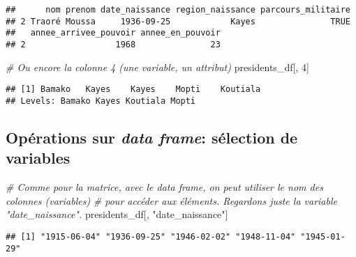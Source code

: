 \documentclass[]{book}
\newenvironment{Shaded}{\begin{snugshade}}{\end{snugshade}}
\newcommand{\DecValTok}[1]{\textcolor[rgb]{0.00,0.00,0.81}{#1}}
\newcommand{\StringTok}[1]{\textcolor[rgb]{0.31,0.60,0.02}{#1}}
\newcommand{\CommentTok}[1]{\textcolor[rgb]{0.56,0.35,0.01}{\textit{#1}}}
\newcommand{\OperatorTok}[1]{\textcolor[rgb]{0.81,0.36,0.00}{\textbf{#1}}}
\newcommand{\NormalTok}[1]{#1}
\begin{document}
\begin{verbatim}
##      nom prenom date_naissance region_naissance parcours_militaire
## 2 Traoré Moussa     1936-09-25            Kayes               TRUE
##   annee_arrivee_pouvoir annee_en_pouvoir
## 2                  1968               23
\end{verbatim}

\begin{Shaded}
\begin{Highlighting}[]
\CommentTok{# Ou encore la colonne 4 (une variable, un attribut)}
\NormalTok{presidents_df[, }\DecValTok{4}\NormalTok{]}
\end{Highlighting}
\end{Shaded}

\begin{verbatim}
## [1] Bamako   Kayes    Kayes    Mopti    Koutiala
## Levels: Bamako Kayes Koutiala Mopti
\end{verbatim}

\normalsize

\subsection{\texorpdfstring{Opérations sur \emph{data frame}: sélection
de
variables}{Opérations sur data frame: sélection de variables}}\label{operations-sur-data-frame-selection-de-variables}

\tiny

\begin{Shaded}
\begin{Highlighting}[]
\CommentTok{# Comme pour la matrice, avec le data frame, on peut utiliser le nom des colonnes (variables) }
\CommentTok{# pour accéder aux éléments. Regardons juste la variable "date_naissance".}
\NormalTok{presidents_df[, }\StringTok{"date_naissance"}\NormalTok{]}
\end{Highlighting}
\end{Shaded}

\begin{verbatim}
## [1] "1915-06-04" "1936-09-25" "1946-02-02" "1948-11-04" "1945-01-29"
\end{verbatim}

\begin{Shaded}
\end{Shaded}
\end{document}
